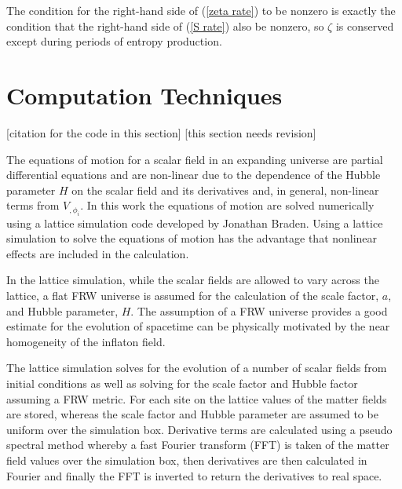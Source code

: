 \documentclass[letterpaper,11pt]{article}
\begin{document}
The condition for the right-hand side of (\ref{zeta rate}) to be nonzero is exactly the condition that the right-hand side of (\ref{S rate}) also be nonzero, so $\zeta$ is conserved except during periods of entropy production.

\section{Computation Techniques}
[citation for the code in this section]
[this section needs revision]

The equations of motion for a scalar field in an expanding universe are partial differential equations and are non-linear due to the dependence of the Hubble parameter $H$ on the scalar field and its derivatives and, in general, non-linear terms from $V_{,\phi_i}$. In this work the equations of motion are solved numerically using a lattice simulation code developed by Jonathan Braden. Using a lattice simulation to solve the equations of motion has the advantage that nonlinear effects are included in the calculation.



In the lattice simulation, while the scalar fields are allowed to vary across the lattice, a flat FRW universe is assumed for the calculation of the scale factor, $a$, and Hubble parameter, $H$. The assumption of a FRW universe provides a good estimate for the evolution of spacetime can be physically motivated by the near homogeneity of the inflaton field.

The lattice simulation solves for the evolution of a number of scalar fields from initial conditions as well as solving for the scale factor and Hubble factor assuming a FRW metric. For each site on the lattice values of the matter fields are stored, whereas the scale factor and Hubble parameter are assumed to be uniform over the simulation box. Derivative terms are calculated using a pseudo spectral method whereby a fast Fourier transform (FFT) is taken of the matter field values over the simulation box, then derivatives are then calculated in Fourier and finally the FFT is inverted to return the derivatives to real space.
\end{document}
